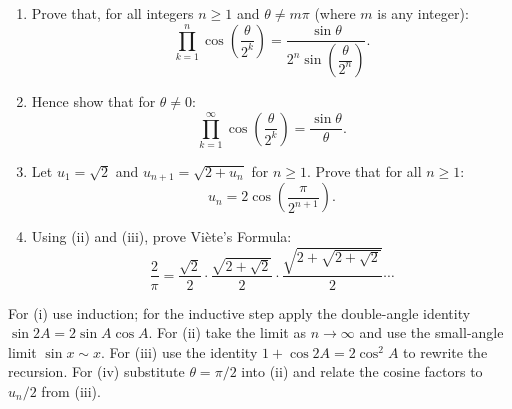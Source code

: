 
\begin{problem}

\begin{enumerate}[label=(\roman*)]
  \item Prove that, for all integers $n\ge1$ and $\theta\neq m\pi$ (where $m$ is any integer):
  \[
    \prod_{k=1}^{n} \cos\left(\frac{\theta}{2^k}\right) 
    = \frac{\sin\theta}{2^n\sin\left(\dfrac{\theta}{2^n}\right)}.
  \]

  \item Hence show that for $\theta\neq0$:
  \[
    \prod_{k=1}^{\infty} \cos\left(\frac{\theta}{2^k}\right) = \frac{\sin\theta}{\theta}.
  \]

  \item Let $u_1=\sqrt{2}$ and $u_{n+1}=\sqrt{2+u_n}$ for $n\ge1$. Prove that for all $n\ge1$:
  \[
    u_n = 2\cos\left(\frac{\pi}{2^{n+1}}\right).
  \]

  \item Using (ii) and (iii), prove Viète's Formula:
  \[
    \frac{2}{\pi} = \frac{\sqrt{2}}{2}\cdot\frac{\sqrt{2+\sqrt{2}}}{2}\cdot\frac{\sqrt{2+\sqrt{2+\sqrt{2}}}}{2}\cdots
  \]
\end{enumerate}
\end{problem}

\begin{hint}
For (i) use induction; for the inductive step apply the double-angle identity
\(\sin 2A = 2\sin A\cos A\). For (ii) take the limit as $n\to\infty$ and use the small-angle limit $\sin x\sim x$. For (iii) use the identity
$1+\cos 2A = 2\cos^2 A$ to rewrite the recursion. For (iv) substitute $\theta=\pi/2$ into (ii) and relate the cosine factors to $u_n/2$ from (iii).
\end{hint}

